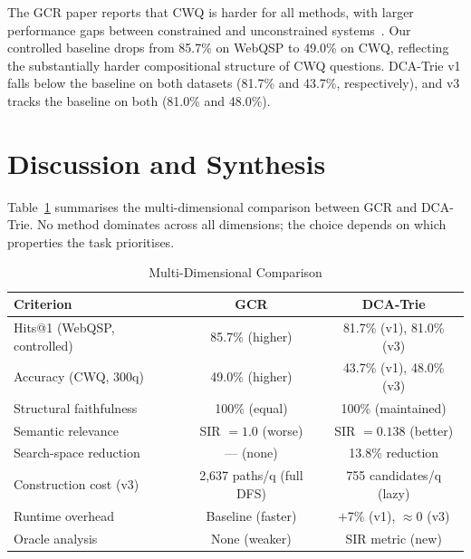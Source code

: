 The GCR paper reports that CWQ is harder for all methods, with larger performance gaps between constrained and unconstrained systems~\citep{luo2025-graph-constrained-reasoning}. Our controlled baseline drops from 85.7\% on WebQSP to 49.0\% on CWQ, reflecting the substantially harder compositional structure of CWQ questions. DCA-Trie v1 falls below the baseline on both datasets (81.7\% and 43.7\%, respectively), and v3 tracks the baseline on both (81.0\% and 48.0\%).

\section{Discussion and Synthesis}
\label{sec:ch4synthesis}

Table~\ref{tab:katamanso_criterion} summarises the multi-dimensional comparison between GCR and DCA-Trie. No method dominates across all dimensions; the choice depends on which properties the task prioritises.

\begin{table}[H]
  \centering
  \caption[GCR vs.\ DCA-Trie Multi-Dimensional Comparison]{Multi-Dimensional Comparison}
  \label{tab:katamanso_criterion}
  \begin{tabularx}{\textwidth}{|X|c|c|}
    \hline
    \textbf{Criterion}            & \textbf{GCR}           & \textbf{DCA-Trie}      \\
    \hline
    Hits@1 (WebQSP, controlled)   & 85.7\% (higher)        & 81.7\% (v1), 81.0\% (v3) \\
    \hline
    Accuracy (CWQ, 300q)          & 49.0\% (higher)        & 43.7\% (v1), 48.0\% (v3) \\
    \hline
    Structural faithfulness       & 100\% (equal)          & 100\% (maintained)     \\
    \hline
    Semantic relevance            & SIR $= 1.0$ (worse)    & SIR $= 0.138$ (better) \\
    \hline
    Search-space reduction        & --- (none)             & 13.8\% reduction       \\
    \hline
    Construction cost (v3)        & 2,637 paths/q (full DFS) & 755 candidates/q (lazy) \\
    \hline
    Runtime overhead              & Baseline (faster)      & $+$7\% (v1), $\approx$0 (v3) \\
    \hline
    Oracle analysis               & None (weaker)          & SIR metric (new)       \\
    \hline
  \end{tabularx}
\end{table}


